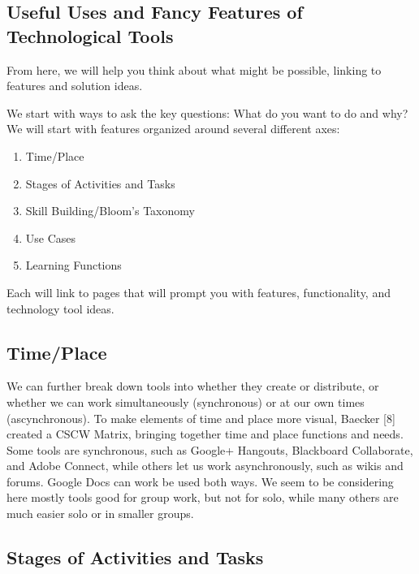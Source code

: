 \hypertarget{useful-uses-and-fancy-features-of-technological-tools}{%
\subsection{Useful Uses and Fancy Features of Technological
Tools}\label{useful-uses-and-fancy-features-of-technological-tools}}

From here, we will help you think about what might be possible, linking
to features and solution ideas.

We start with ways to ask the key questions: What do you want to do and
why? We will start with features organized around several different
axes:

\begin{enumerate}
\def\labelenumi{\arabic{enumi}.}
\tightlist
\item
  Time/Place
\item
  Stages of Activities and Tasks
\item
  Skill Building/Bloom's Taxonomy
\item
  Use Cases
\item
  Learning Functions
\end{enumerate}

Each will link to pages that will prompt you with features,
functionality, and technology tool ideas.

\hypertarget{timeplace}{%
\subsection{Time/Place}\label{timeplace}}

We can further break down tools into whether they create or distribute,
or whether we can work simultaneously (synchronous) or at our own times
(ascynchronous). To make elements of time and place more visual, Baecker
{{[}8{]}} created a CSCW Matrix, bringing together time and place
functions and needs. Some tools are synchronous, such as Google+
Hangouts, Blackboard Collaborate, and Adobe Connect, while others let us
work asynchronously, such as wikis and forums. Google Docs can work be
used both ways. We seem to be considering here mostly tools good for
group work, but not for solo, while many others are much easier solo or
in smaller groups.

\hypertarget{stages-of-activities-and-tasks}{%
\subsection{Stages of Activities and
Tasks}\label{stages-of-activities-and-tasks}}


